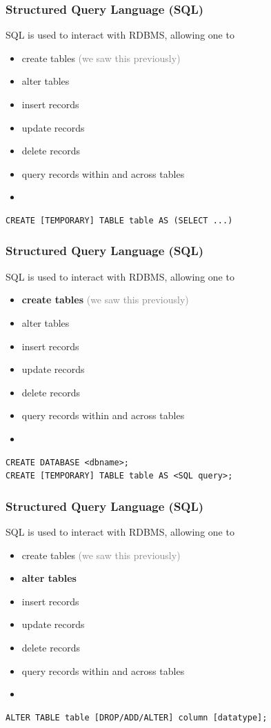 \documentclass[xcolor={dvipsnames}]{beamer}
\begin{document}
\begin{frame}[fragile]\frametitle{Structured Query Language (SQL)}
SQL is used to interact with RDBMS, allowing one to 
\begin{itemize}
\item create tables \textcolor{gray}{(we saw this previously)}
\item alter tables
\item insert records
\item update records
\item delete records
\item query records within and across tables
\item[]
\end{itemize}

\color{white}\begin{verbatim}
CREATE [TEMPORARY] TABLE table AS (SELECT ...)
\end{verbatim}
\end{frame}


\begin{frame}[fragile]\frametitle{Structured Query Language (SQL)}

\vspace{.75em}

SQL is used to interact with RDBMS, allowing one to 
\begin{itemize}
\item \textbf{create tables} \textcolor{gray}{(we saw this previously)}
\item alter tables
\item insert records
\item update records
\item delete records
\item query records within and across tables
\item[]
\end{itemize}

\begin{verbatim}
CREATE DATABASE <dbname>;
CREATE [TEMPORARY] TABLE table AS <SQL query>;
\end{verbatim}
\end{frame}

\begin{frame}[fragile]\frametitle{Structured Query Language (SQL)}
SQL is used to interact with RDBMS, allowing one to 
\begin{itemize}
\item create tables \textcolor{gray}{(we saw this previously)}
\item \textbf{alter tables}
\item insert records
\item update records
\item delete records
\item query records within and across tables
\item[]
\end{itemize}

\begin{verbatim}
ALTER TABLE table [DROP/ADD/ALTER] column [datatype];
\end{verbatim}
\end{frame}
\end{document}

